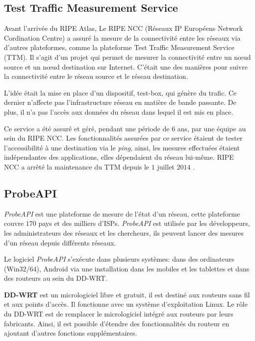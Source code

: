 \subsection{Test Traffic Measurement Service}

Avant l'arrivée du RIPE Atlas, Le RIPE NCC (Réseaux IP Européens Network Cordination Centre)   a assuré la mesure de la connectivité entre les réseaux via  d'autres plateformes, comme la plateforme Test Traffic Measurement Service (TTM). Il s'agit d'un projet qui permet de mesurer la connectivité entre un n\oe{}ud  source  et  un n\oe{}ud destination sur Internet.  C'était une des manières  pour  suivre la connectivité entre le réseau source et le réseau destination. 

L'idée était la mise en place d'un dispositif, test-box,  qui génère du trafic. Ce dernier n'affecte pas l'infrastructure réseau en matière de bande passante. De plus, il n'a pas l'accès aux données du réseau dans lequel il est mis en place.

Ce service a été assuré et géré, pendant une période de $6$ ans, par une équipe au sein du RIPE NCC. Les fonctionnalités assurées par ce service étaient de tester l'accessibilité à une destination via le \textit{ping}, ainsi, les mesures effectuées étaient indépendantes des applications, elles dépendaient du  réseau lui-même. RIPE NCC   a  arrêté la maintenance du  TTM depuis le $1$ juillet $2014$ \cite{TTM}.


\subsection{ProbeAPI}

\textit{ProbeAPI} \cite{PROBEAPI} est  une plateforme de mesure de l'état  d'un réseau, cette plateforme couvre $170$ pays et des milliers d'ISPs. \textit{ProbeAPI} est utilisée par les développeurs, les administrateurs des réseaux et les chercheurs, ils peuvent lancer des mesures d'un réseau depuis différents réseaux.

Le logiciel \textit{ProbeAPI}  s'exécute dans plusieurs systèmes: dans des ordinateurs (Win$32$/$64$), Android via une installation dans les mobiles et les tablettes et   dans des routeurs au sein du DD-WRT.

\begin{tcolorbox}
	\textbf{DD-WRT} est un micrologiciel libre et gratuit, il est destiné aux routeurs sans fil et aux points d'accès. Il fonctionne  avec un système d'exploitation Linux. Le rôle du DD-WRT est de remplacer le micrologiciel intégré aux routeurs par leurs fabricants. Ainsi, il est possible  d'étendre des fonctionnalités du routeur en ajoutant d'autres fonctions supplémentaires.
\end{tcolorbox}


